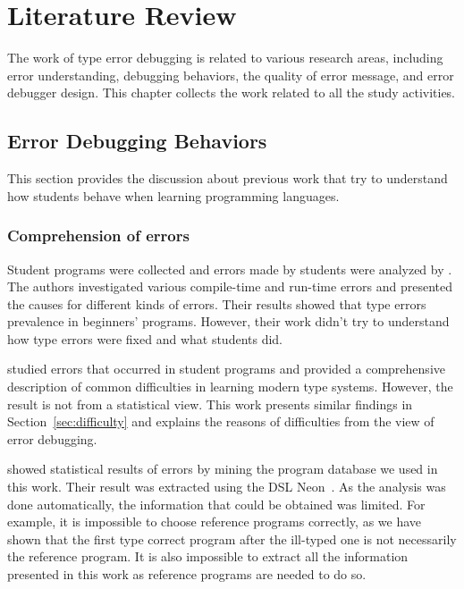 \documentclass[12pt]{report}	%
\begin{document}

\chapter{Literature Review}
\label{sec:review}

The work of type error debugging is related to various research areas, including
error understanding, debugging behaviors, the quality of error message,
and error debugger design.
This chapter collects the work related to all the study activities.

\section{Error Debugging Behaviors}
\label{sec:review:behavior}

This section provides the discussion about previous work that try to understand how students behave when learning programming languages.

\subsection{Comprehension of errors}

Student programs were collected and errors made by students
were analyzed by \cite{tirronen2015understanding}.
The authors investigated various compile-time and run-time errors
and presented the causes for different kinds of errors.
Their results showed that type errors prevalence in beginners' programs.
However, their work didn't try to understand how type
errors were fixed and what students did.

\cite{tirronen2014study} studied
errors that occurred in student programs and
provided a comprehensive description of
common difficulties in learning modern type systems.
However, the result is not from a statistical view.
This work presents similar findings in Section~\ref{sec:difficulty}
and explains the
reasons of difficulties from the view of error debugging.

\cite{hage2006mining} showed statistical
results of errors by mining the program database we used
in this work.
Their result was extracted using the DSL Neon~\cite{Hage09:Neon}.
As the analysis was done automatically, the information that
could be obtained was limited. For example, it is impossible
to choose reference programs correctly, as we have shown that
the first type correct program after the ill-typed one is not
necessarily the reference program. It is also impossible to
extract all the information presented in this work as
reference programs are needed to do so.
\end{document}
